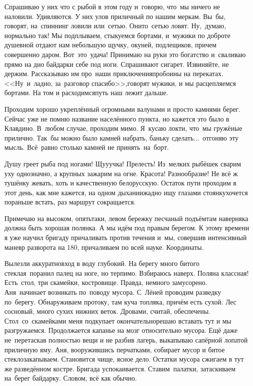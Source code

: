 Спрашиваю у них что с рыбой в этом году и~говорю, что~мы ничего не наловили. Удивляются. У них улов приличный по нашим меркам. Вы~бы, говорят, на~спиннинг ловили или~сетью. Они\sdash то~сетью ловят. Ну,~думаю, нормально так! Мы подплываем, стыкуемся бортами, и~мужики по доброте душевной отдают нам небольшую щучку, окуней, подлещиков, причем совершенно даром. Вот~это~удача! Принимаю на руки это богатство и~сваливаю прямо на дно байдарки себе под ноги. Спрашивают сигарет. Извиняйте, не держим. Рассказываю им про~наши приключения\mdash пробоины на перекатах. <<Ну~и~ладно, за~разговор спасибо>>,\mdash говорят мужики, и мы расцепляемся бортами. На том и расходимся\mdash путь наш лежит дальше.

Проходим хорошо укреплённый огромными валунами и просто камнями берег. Сейчас уже не помню название населённого пункта, но кажется это было в Клавдино. В~любом случае, проходим мимо. Я~кусаю локти, что~мы гружёные прилично. Так~бы можно было камней набрать, баньку сделать$\ldots$~отгоняю эту мысль. Всё~равно столько камней не принять~на~борт.

Душу греет рыба под ногами! Щу\sdash у\sdash учка! Прелесть! Из~мелких рыбёшек сварим уху однозначно, а крупных зажарим на огне. Красота! Разнообразие! Не всё ж тушёнку жевать, хоть и качественную белорусскую. Остаток пути проходим в этот день, как мне кажется, на одном дыхании\mdash жадно ищу глазами стоянку\mdash хочется пораньше встать, раз маршрут сокращается. 

Примечаю на высоком, опять\sdash таки, левом бережку песчаный подъём\mdash там наверняка должна быть хорошая полянка. А мы идём под правым берегом. К этому времени я уже научил бригаду причаливать против течения и~мы, совершив интенсивный маневр разворота на 180\degree, причаливаем по всей науке. Координаты\mdash \CoordsChagodoschaFifteenSecondDnevka. 

Вылезли аккуратно\mdash вход в воду глубокий. На берегу много битого стекла\mdash я~поранил палец на ноге, но терпимо. Взбираюсь наверх. Поляна классная! Есть~стол, три скамейки, костровище. Правда, немного замусорено. Аня~начинает возникать по~поводу мусора. С~Лёней проводим разведку по~берегу. Обнаруживаем протоку, там куча топляка, причём есть сухой. Лес сосновый, много сухих нижних веток. Дровами, считай, обеспечены. Стол~со~скамейками меня подкупает окончательно\mdash решаю вставать тут и мы разгружаемся. Продолжается капанье на мозг относительно мусора. Ещё даже не~перетаскав полностью вещи и не разбив лагерь, выкапываю сапёрной лопатой приличную яму. Аня, вооружившись перчатками, собирает мусор и битое стекло\mdash закапываем. Становится чище, ясное дело. Остатки мусора сжигаем в тут же разведённом костре. Бригада успокаивается. Ставим~палатки, затаскиваем на~берег байдарку. Словом, всё как обычно. 

